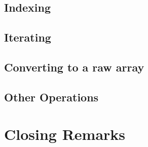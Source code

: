 \documentclass{article}
\begin{document}
	\subsection{Indexing}
	\label{subsec:Indexing}
	
	
	
	
	
	
	
	
	
	\subsection{Iterating}
	\label{subsec:Iterating}
	
	
	
	
	
	
	
	
	
	\subsection{Converting to a raw array}
	\label{subsec:ConvertRawArray}
	
	

	
	
	
	
	
	
	\subsection{Other Operations}
	
	
	
	\section{Closing Remarks}
	
	
	
	\newpage
	
	
	
	\newpage
	
	
\end{document}
